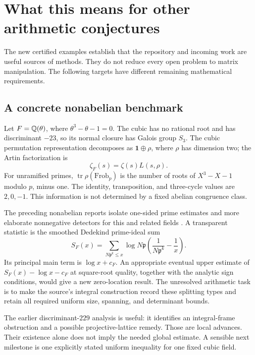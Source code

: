 \section{What this means for other arithmetic conjectures}
\label{sec:targets}

The new certified examples establish that the repository and incoming work
are useful sources of methods. They do not reduce every open problem to
matrix manipulation. The following targets have different remaining
mathematical requirements.

\subsection{A concrete nonabelian benchmark}

Let \(F=\mathbb Q(\theta)\), where \(\theta^3-\theta-1=0\). The cubic has no
rational root and has discriminant \(-23\), so its normal closure has
Galois group \(S_3\). The cubic permutation representation decomposes as
\(\mathbf1\oplus\rho\), where \(\rho\) has dimension two; the Artin
factorization is
\[
\zeta_F(s)=\zeta(s)L(s,\rho).
\]
For unramified primes, \(\operatorname{tr}\rho(\mathrm{Frob}_p)\) is the
number of roots of \(X^3-X-1\) modulo \(p\), minus one.
The identity, transposition, and three-cycle values are \(2,0,-1\).
This information is not determined by a fixed abelian congruence class.

The preceding nonabelian reports isolate one-sided prime estimates
and more elaborate nonnegative detectors for this and related fields
\cite{IncomingNonabelian,IncomingBridges}. A transparent statistic is
the smoothed Dedekind prime-ideal sum
\[
S_F(x)=\sum_{N\mathfrak p^k\le x}
\log N\mathfrak p
\left(\frac1{N\mathfrak p^k}-\frac1x\right).
\]
Its principal main term is \(\log x+c_F\).
An appropriate eventual upper estimate of
\(S_F(x)-\log x-c_F\) at square-root quality, together with the
analytic sign conditions, would give a new zero-location result.
The unresolved arithmetic task is to make the source's integral
construction record these splitting types and retain all required
uniform size, spanning, and determinant bounds.

The earlier discriminant-\(229\) analysis is useful: it identifies
an integral-frame obstruction and a possible projective-lattice remedy.
Those are local advances. Their existence alone does not imply the
needed global estimate. A sensible next milestone is one explicitly
stated uniform inequality for one fixed cubic field.

